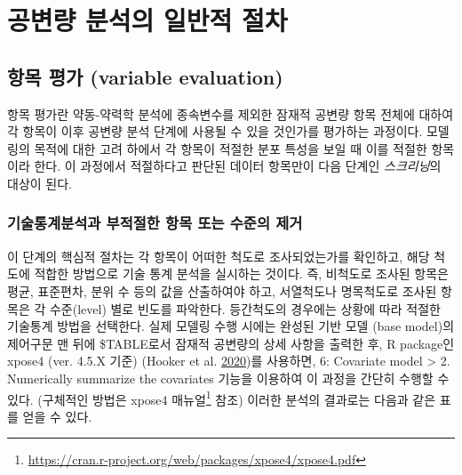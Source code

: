 \documentclass[
  10pt,
  krantz2,
  a4paper]{krantz}
\theoremstyle{definition}
\theoremstyle{definition}
\theoremstyle{definition}
\theoremstyle{remark}
\begin{document}
\hypertarget{uxacf5uxbcc0uxb7c9-uxbd84uxc11duxc758-uxc77cuxbc18uxc801-uxc808uxcc28}{%
\section{공변량 분석의 일반적 절차}\label{uxacf5uxbcc0uxb7c9-uxbd84uxc11duxc758-uxc77cuxbc18uxc801-uxc808uxcc28}}

\hypertarget{variable-eval}{%
\subsection{항목 평가 (variable evaluation)}\label{variable-eval}}

항목 평가란 약동-약력학 분석에 종속변수를 제외한 잠재적 공변량 항목 전체에 대하여 각 항목이 이후 공변량 분석 단계에 사용될 수 있을 것인가를 평가하는 과정이다. 모델링의 목적에 대한 고려 하에서 각 항목이 적절한 분포 특성을 보일 때 이를 적절한 항목이라 한다. 이 과정에서 적절하다고 판단된 데이터 항목만이 다음 단계인 \emph{스크리닝}의 대상이 된다.

\hypertarget{uxae30uxc220uxd1b5uxacc4uxbd84uxc11duxacfc-uxbd80uxc801uxc808uxd55c-uxd56duxbaa9-uxb610uxb294-uxc218uxc900uxc758-uxc81cuxac70}{%
\subsubsection{기술통계분석과 부적절한 항목 또는 수준의 제거}\label{uxae30uxc220uxd1b5uxacc4uxbd84uxc11duxacfc-uxbd80uxc801uxc808uxd55c-uxd56duxbaa9-uxb610uxb294-uxc218uxc900uxc758-uxc81cuxac70}}

이 단계의 핵심적 절차는 각 항목이 어떠한 척도로 조사되었는가를 확인하고, 해당 척도에 적합한 방법으로 기술 통계 분석을 실시하는 것이다. 즉, 비척도로 조사된 항목은 평균, 표준편차, 분위 수 등의 값을 산출하여야 하고, 서열척도나 명목척도로 조사된 항목은 각 수준(level) 별로 빈도를 파악한다. 등간척도의 경우에는 상황에 따라 적절한 기술통계 방법을 선택한다. 실제 모델링 수행 시에는 완성된 기반 모델 (base model)의 제어구문 맨 뒤에 \$TABLE로서 잠재적 공변량의 상세 사항을 출력한 후, R package인 xpose4 (ver. 4.5.X 기준) (Hooker et al. \protect\hyperlink{ref-R-xpose4}{2020})를 사용하면, 6: Covariate model \textgreater{} 2. Numerically summarize the covariates 기능을 이용하여 이 과정을 간단히 수행할 수 있다. (구체적인 방법은 xpose4 매뉴얼\footnote{\url{https://cran.r-project.org/web/packages/xpose4/xpose4.pdf}} 참조) 이러한 분석의 결과로는 다음과 같은 표를 얻을 수 있다.
\end{document}
